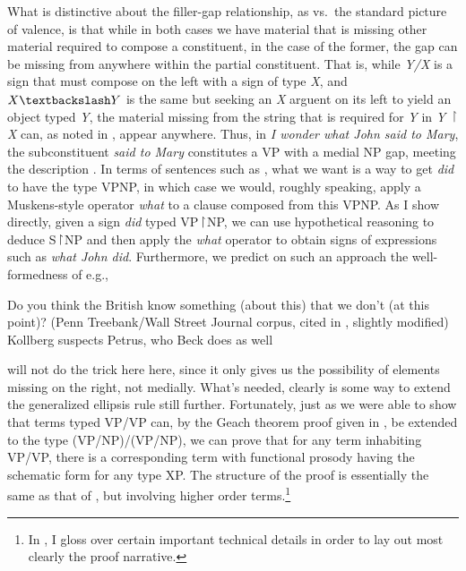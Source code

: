 \documentclass[output=paper,colorlinks,citecolor=brown]{langscibook}
\begin{document}
What is distinctive about the filler-gap relationship, as vs.\  the
standard picture of valence, is that while in both cases we have material
that is missing other material required to compose a constituent, in
the case of the former, the gap can be missing from anywhere within
the partial constituent. That is, while \textit{Y/X} is a sign that must
compose on the left with a sign of type \textit{X}, and $X\bsl Y$ is the same
but seeking an \textit{X} arguent on its left to yield an object typed \textit{Y},
the material missing from the string that is required for \textit{Y} in
\textit{Y} \ensuremath{\vs}\textit{X} can, as noted in , appear
anywhere. Thus, in \textit{I wonder what John said to Mary}, the
subconstituent \textit{said {\gp}\xspace to Mary} constitutes a VP with a medial NP
gap, meeting the description . In terms of sentences such as
, what we want is a way to get \textit{did} to have the type
VP\vs NP, in which case we would, roughly speaking, apply a Muskens-style
operator \textit{what} to a clause composed from this VP\vs NP. As I show
directly, given a sign \textit{did} typed VP\ensuremath{\vs}NP, we can use hypothetical
reasoning to deduce S\ensuremath{\vs}NP and then apply the \textit{what} operator to obtain
signs of expressions such as \textit{what John did}. Furthermore, we predict
on such an approach the well-formedness of e.g.,

\begin{exe}
 \ex\label{internal}
  \begin{xlist}
 \ex\label{}
    Do you think the British know something (about this) that we don't
(at this point)? (Penn Treebank/Wall Street Journal corpus, cited in
\citet{bos-spenader2011}, slightly modified)
 \ex\label{}
    Kollberg suspects Petrus, who Beck does {\gp}\xspace as well \citep[666]{kennedy1995}
  \end{xlist}
\end{exe}
 will not do the trick here here, since it only gives us
the possibility of elements missing on the right, not medially. What's
needed, clearly is some way to extend the generalized ellipsis rule
still further. Fortunately, just as we were able to show that terms
typed VP/VP can, by the Geach theorem proof given in , be
extended to the type (VP/NP)/(VP/NP), we can prove that for any term
inhabiting VP/VP, there is a corresponding term with functional
prosody having the schematic form  for any type XP.
The structure of the proof is essentially the same as that of
, but involving higher order terms.\footnote{In
, I gloss over certain important technical details in
order to lay out most clearly the proof narrative.}
\end{document}
